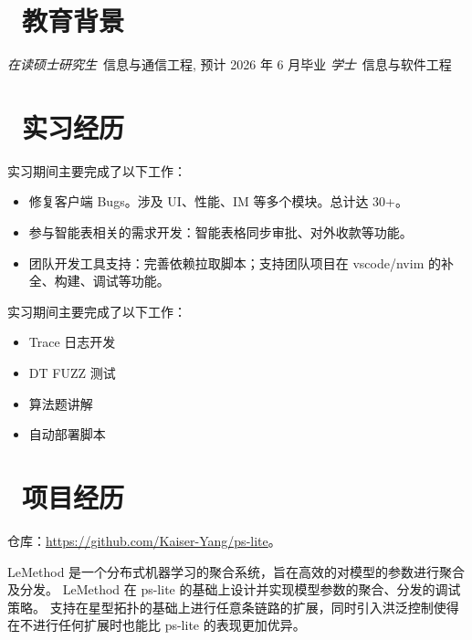 \documentclass{resume}
\begin{document}


 
\section{\faGraduationCap\  教育背景}
\textit{在读硕士研究生}\ 信息与通信工程, 预计 2026 年 6 月毕业
\textit{学士}\ 信息与软件工程

\section{\faUsers\ 实习经历}
\begin{onehalfspacing}
实习期间主要完成了以下工作：
\begin{itemize}
  \item 修复客户端 Bugs。涉及 UI、性能、IM 等多个模块。总计达 30+。
  \item 参与智能表相关的需求开发：智能表格同步审批、对外收款等功能。
  \item 团队开发工具支持：完善依赖拉取脚本；支持团队项目在 vscode/nvim 的补全、构建、调试等功能。
\end{itemize}
\end{onehalfspacing}

\begin{onehalfspacing}
实习期间主要完成了以下工作：
\begin{itemize}
  \item Trace 日志开发
  \item DT FUZZ 测试
  \item 算法题讲解
  \item 自动部署脚本
\end{itemize}
\end{onehalfspacing}

\section{\faUsers\ 项目经历}
\begin{onehalfspacing}
仓库：\url{https://github.com/Kaiser-Yang/ps-lite}。

LeMethod 是一个分布式机器学习的聚合系统，旨在高效的对模型的参数进行聚合及分发。
LeMethod 在 ps-lite 的基础上设计并实现模型参数的聚合、分发的调试策略。
支持在星型拓扑的基础上进行任意条链路的扩展，同时引入洪泛控制使得在不进行任何扩展时也能比 ps-lite 的表现更加优异。
\end{onehalfspacing}
\end{document}
